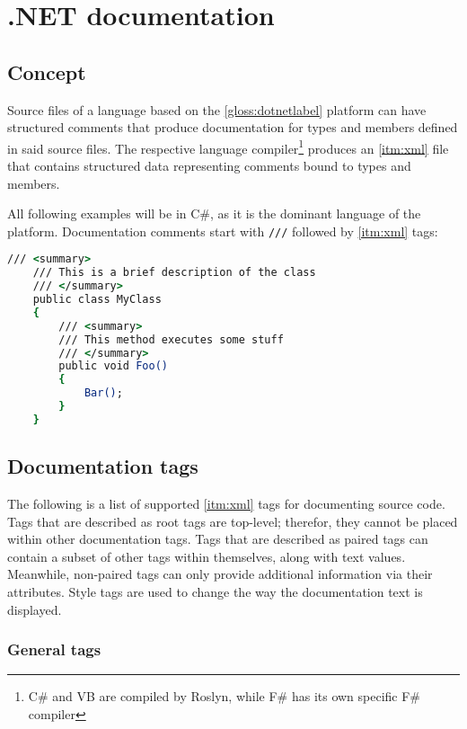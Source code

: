 \chapter{.NET documentation} \label{chap:netDocumentation}

\section{Concept}

Source files of a language based on the \ref{gloss:dotnetlabel} platform can have structured comments that produce documentation for types and members defined in said source files. The respective language compiler\footnote{C\# and VB are compiled by Roslyn, while F\# has its own specific F\# compiler} produces an \ref{itm:xml} file that contains structured data representing comments bound to types and members.
\cite{wagner_xml_2022}

All following examples will be in C\#, as it is the dominant language of the platform. Documentation comments start with \lstinline[language=csh]{///} followed by \ref{itm:xml} tags:

\begin{lstlisting}[language=csh]
    /// <summary>
    /// This is a brief description of the class
    /// </summary>
    public class MyClass
    {
        /// <summary>
        /// This method executes some stuff
        /// </summary>
        public void Foo()
        {
            Bar();
        }
    }
\end{lstlisting}

\section{Documentation tags}

The following is a list of supported \ref{itm:xml} tags for documenting source code.
Tags that are described as root tags are top-level; therefor, they cannot be placed within other documentation tags.
Tags that are described as paired tags can contain a subset of other tags within themselves, along with text values.
Meanwhile, non-paired tags can only provide additional information via their attributes.
Style tags are used to change the way the documentation text is displayed.

\subsection{General tags}

